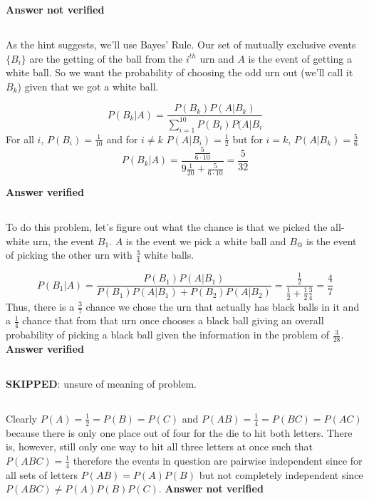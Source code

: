\textbf{Answer not verified}

\subsection{}
As the hint suggests, we'll use Bayes' Rule.  Our set of mutually exclusive events $\{ B_i\}$ are the getting of the ball from the $i^{th}$ urn and $A$ is the event of getting a white ball.  So we want the probability of choosing the odd urn out (we'll call it $B_k$) given that we got a white ball.

\begin{equation}
	P(B_k|A) = \frac{P(B_k)P(A|B_k)}{\sum_{i=1}^{10} P(B_i)P(A|B_i}
\end{equation}
For all $i$, $P(B_i) = \frac{1}{10}$ and for $i \neq k$ $P(A|B_i) = \frac{1}{2}$ but for $i=k$,  $P(A|B_k) = \frac{5}{6}$
\begin{equation}
	P(B_k|A) = \frac{\frac{5}{6 \cdot 10}}{9\frac{1}{20} + \frac{5}{6 \cdot 10}} = \frac{5}{32}
\end{equation}

\textbf{Answer verified}

\subsection{}
To do this problem, let's figure out what the chance is that we picked the all-white urn, the event $B_1$. $A$ is the event we pick a white ball and $B_@$ is the event of picking the other urn with $\frac{3}{4}$ white balls.

\begin{equation}
	P(B_1|A) = \frac{P(B_1)P(A|B_1)}{P(B_1)P(A|B_1) + P(B_2)P(A|B_2)} = \frac{\frac{1}{2}}{\frac{1}{2} + \frac{1}{2} \frac{3}{4}} = \frac{4}{7}
\end{equation}
Thus, there is a $\frac{3}{7}$ chance we chose the urn that actually has black balls in it and a $\frac{1}{4}$ chance that from that urn once chooses a black ball giving an overall probability of picking a black ball given the information in the problem of $\frac{3}{28}$.
\textbf{Answer verified}

\subsection{}
\textbf{SKIPPED}: unsure of meaning of problem.

\subsection{}
Clearly $P(A) = \frac{1}{2} = P(B) = P(C)$ and $P(AB) = \frac{1}{4} = P(BC) = P(AC)$ because there is only one place out of four for the die to hit both letters.  There is, however, still only one way to hit all three letters at once such that $P(ABC)=\frac{1}{4}$ therefore  the events in question are pairwise independent since for all sets of letters $P(AB)=P(A)P(B)$ but not completely independent since $P(ABC) \neq P(A)P(B)P(C)$.
\textbf{Answer not verified}

